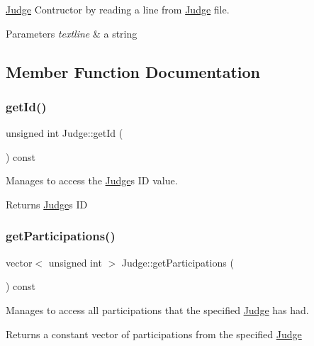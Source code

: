 \hyperlink{class_judge}{Judge} Contructor by reading a line from \hyperlink{class_judge}{Judge} file. 


\begin{DoxyParams}{Parameters}
{\em textline} & a string \\
\hline
\end{DoxyParams}


\subsection{Member Function Documentation}
\mbox{\label{class_judge_a1db442ff16710223a937fbeb7784c576}} 
\subsubsection{\texorpdfstring{get\+Id()}{getId()}}
{\footnotesize\ttfamily unsigned int Judge\+::get\+Id (\begin{DoxyParamCaption}{ }\end{DoxyParamCaption}) const}



Manages to access the \hyperlink{class_judge}{Judge}\textquotesingle{}s ID value. 

\begin{DoxyReturn}{Returns}
\hyperlink{class_judge}{Judge}\textquotesingle{}s ID 
\end{DoxyReturn}
\mbox{\label{class_judge_aa854dfe7153ff301cba9319caeb3599c}} 
\subsubsection{\texorpdfstring{get\+Participations()}{getParticipations()}}
{\footnotesize\ttfamily vector$<$ unsigned int $>$ Judge\+::get\+Participations (\begin{DoxyParamCaption}{ }\end{DoxyParamCaption}) const}



Manages to access all participations that the specified \hyperlink{class_judge}{Judge} has had. 

\begin{DoxyReturn}{Returns}
a constant vector of participations from the specified \hyperlink{class_judge}{Judge} 
\end{DoxyReturn}
\mbox{\label{class_judge_a748c3fae9d2a6cea4952d31ebe2bb660}} 
